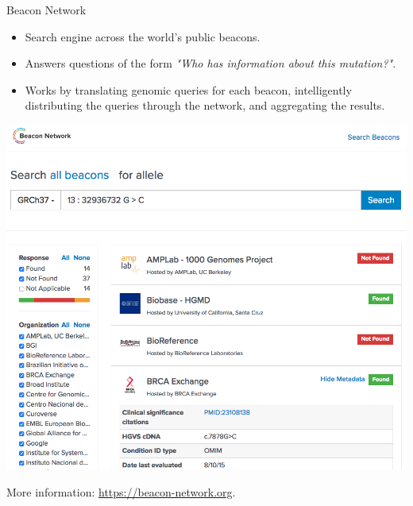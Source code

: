 \documentclass{beamer}
\begin{document}
\begin{frame}[fragile]
\begin{columns}[T]
\begin{column}{.31\textwidth}
\begin{block}{Beacon Network \hfill{}}
\begin{itemize}
\item Search engine across the world's public beacons.
\item Answers questions of the form \textit{"Who has information about this mutation?"}.
\item Works by translating genomic queries for each beacon, intelligently distributing the queries through the network, and aggregating the results.
\end{itemize}
\begin{center}
\vspace{-1em}
\includegraphics[width=\linewidth]{img/client.png}
\vspace{-1em}
\end{center}
More information: \url{https://beacon-network.org}.
\end{block}
\end{column}


\end{columns}
\end{frame}
\end{document}
